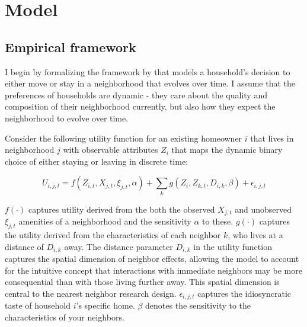 \documentclass[../main.tex]{subfiles}
\begin{document}
\section{Model}
\label{sec:model}


\subsection{Empirical framework}
I begin by formalizing the framework by \textcite{Bayer_2022_nearest_neighbor} that models a household's decision to either move or stay in a neighborhood that evolves over time. I assume that the preferences of households are dynamic - they care about the quality and composition of their neighborhood currently, but also how they expect the neighborhood to evolve over time. 


Consider the following utility function for an existing homeowner $i$ that lives in neighborhood $j$ with observable attributes $Z_i$ that maps the dynamic binary choice of either staying or leaving in discrete time:

\begin{equation}
    U_{i, j, t} = f(Z_{i,t}, X_{j, t}, \xi_{j,t }, \alpha) + \sum_k g(Z_i, Z_{k, t}, D_{i, k}, \beta) + \epsilon_{i, j, t}
    \label{eq:utility_household_moving}
\end{equation}



$f(\cdot)$ captures utility derived from the both the observed $X_{j,t}$ and unobserved $\xi_{j,t}$ amenities of a neighborhood and the sensitivity $\alpha$ to these. $g(\cdot)$ captures the utility derived from the characteristics of each neighbor $k$, who lives at a distance of $D_{i, k}$ away. The distance parameter $D_{i,k}$ in the utility function captures the spatial dimension of neighbor effects, allowing the model to account for the intuitive concept that interactions with immediate neighbors may be more consequential than with those living further away. This spatial dimension is central to the nearest neighbor research design. $\epsilon_{i, j, t}$ captures the idiosyncratic taste of household $i$'s specific home. $\beta$ denotes the sensitivity to the characteristics of your neighbors.
\end{document}

